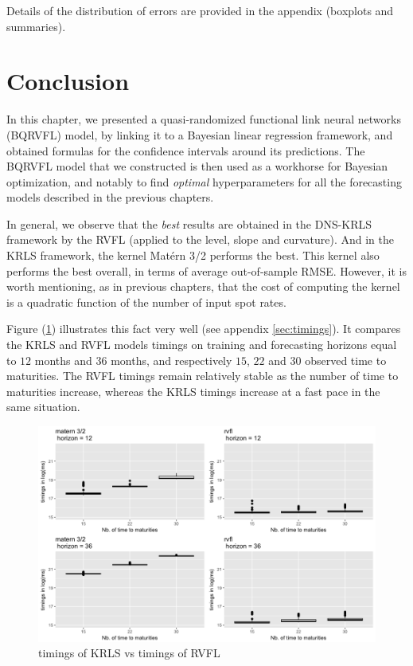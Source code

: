 Details of the distribution of errors are provided in the appendix (boxplots and summaries). 

\newpage

\section{Conclusion}

In this chapter, we presented a quasi-randomized functional link neural networks (BQRVFL) model, by linking it to a Bayesian linear regression framework, and obtained formulas for the confidence intervals around its predictions. The BQRVFL model that we constructed is then used as a workhorse for Bayesian optimization, and notably to find \textit{optimal} hyperparameters for all the forecasting models described in the previous chapters.

In general, we observe that the \textit{best} results are obtained in the DNS-KRLS framework by the RVFL (applied to the level, slope and curvature). And in the KRLS framework, the kernel Mat\'ern 3/2 performs the best. This kernel also performs the best overall, in terms of average out-of-sample RMSE. However, it is worth mentioning, as in previous chapters, that the cost of computing the kernel is a quadratic function of the number of input spot rates. 

Figure (\ref{timings}) illustrates this fact very well (see appendix \ref{sec:timings}). It compares the KRLS and RVFL models timings on training and forecasting horizons equal to $12$ months and $36$ months, and respectively $15$, $22$ and $30$ observed time to maturities. The RVFL timings remain relatively stable as the number of time to maturities increase, whereas the KRLS timings increase at a fast pace in the same situation.

\begin{figure}[!htb]
\centering
\includegraphics[width=14cm]{gfx/chapter-bayesianrvfl/timings.png}
\caption{timings of KRLS vs timings of RVFL}
\label{timings}
\end{figure}

